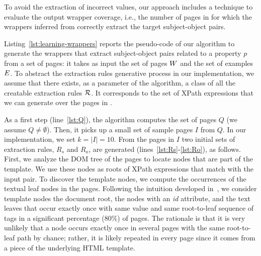 

To avoid the extraction of incorrect values, our approach includes a technique to evaluate the output wrapper coverage, i.e., the number of pages in {\allpages} for which the wrappers inferred from {\somepages} correctly extract the target subject-object pairs. 


Listing~\ref{lst:learning-wrappers} reports the pseudo-code of our algorithm to generate the wrappers that extract subject-object pairs related to a property $p$ from a set of pages: 
%
it takes as input the set of pages $\mbox{\ensuremath{W}}$ and the set of examples ${\mbox{\ensuremath{E}}}$.
To abstract the extraction rules generative process in our implementation, we assume that there exists, as a parameter of the algorithm, a class of all the creatable extraction rules $\mathcal{R}$. It corresponds to the set of XPath expressions that we can generate over the pages in \allpages.



As a first step (line~\ref{lst:Q}), the algorithm computes the set of pages $Q$
(we assume $Q \neq \emptyset$).
Then, it picks up a small set of sample pages $I$ from $Q$.%
In our implementation, we set $k = |I| = 10$.
%
From the pages in $I$ two initial sets of extraction rules, $R_s$ and $R_o$, are generated (lines~\ref{lst:Rs}-\ref{lst:Ro}), as follows. 
%
%
First, we analyze the DOM tree of the pages to locate nodes that are part 
of the template. We use these nodes as roots of XPath expressions that 
match with the input pair. To discover the template nodes, we compute the occurrences of the textual leaf nodes in the pages. Following the intuition developed in~\cite{exalg}, 
we consider template nodes the document root, the nodes with an {\em id} attribute, 
and  the text leaves that occur exactly once  with same value and same root-to-leaf sequence of tags in a significant 
percentage (80\%) of pages.  The rationale is that it is very unlikely that a node occurs exactly once in several pages with the same root-to-leaf path by chance; rather, it is likely repeated  in every page since it comes from a piece of the underlying HTML template.

